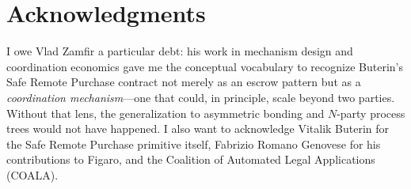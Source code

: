 \documentclass[11pt,a4paper]{article}
\theoremstyle{definition}
\theoremstyle{remark}
\begin{document}
\section*{Acknowledgments}
I owe Vlad Zamfir a particular debt: his work in mechanism design and
coordination economics gave me the conceptual vocabulary to recognize
Buterin's Safe Remote Purchase contract not merely as an escrow pattern
but as a \emph{coordination mechanism}---one that could, in principle,
scale beyond two parties. Without that lens, the generalization to
asymmetric bonding and $N$-party process trees would not have
happened. I also want to acknowledge Vitalik Buterin for the Safe
Remote Purchase primitive itself, Fabrizio Romano Genovese for his
contributions to Figaro, and the Coalition of Automated Legal
Applications (COALA).


\end{document}
